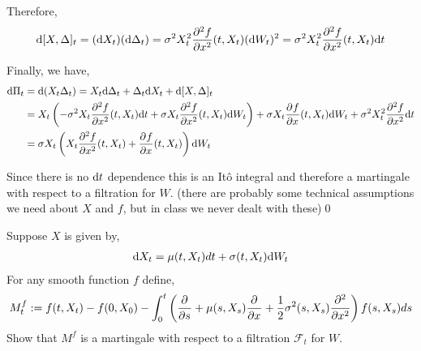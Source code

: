 \begin{solution}[Solution]
Therefore,
\begin{align*}
    \d[X,\Delta]_t = (\d X_t)(\d \Delta_t) 
    = \sigma^2 X_t^2 \dfrac{\partial^2f}{\partial x^2}(t,X_t) (\d W_t)^2 
    = \sigma^2 X_t^2 \dfrac{\partial^2f}{\partial x^2}(t,X_t) \d t
\end{align*}


Finally, we have,
\begin{align*}
    \d \Pi_t &= \d(X_t \Delta _t) = X_t \d\Delta _t + \Delta_t \d X_t + \d[X,\Delta]_t \\
    &= X_t \left( -\sigma^2 X_t \pp[2]{f}{x}(t,X_t) \d t + \sigma X_t \pp[2]{f}{x}(t,X_t)\d W_t \right) 
    + \sigma X_t \pp{f}{x}(t,X_t) \d W_t 
    + \sigma^2 X_t^2 \pp[2]{f}{x} \d t 
    \\&= \sigma X_t \left( X_t \pp[2]{f}{x}(t,X_t) + \pp{f}{x}(t,X_t)\right) \d W_t
\end{align*}

Since there is no \( \d t \) dependence this is an It\^o integral and therefore a martingale with respect to a filtration for \( W \). (there are probably some technical assumptions we need about \( X \) and \( f \), but in class we never dealt with these)\qed

\end{solution}

\begin{problem}[Exercise 8.4]
Suppose \( X \) is given by,
\begin{align*}
    \d X_t = \mu(t,X_t)dt + \sigma(t,X_t) \d W_t
\end{align*}
For any smooth function \( f \) define,
\begin{align*}
    M_t^f:= f(t,X_t) - f(0,X_0) - \int_{0}^{t} \left( \pp{}{s} + \mu(s,X_s)\pp{}{x} + \dfrac{1}{2}\sigma^2(s,X_s) \pp[2]{}{x} \right) f(s,X_s)ds
\end{align*}
    Show that \( M^f \) is a martingale with respect to a filtration \( \mathcal{F}_t \) for \( W \).
\end{problem}


